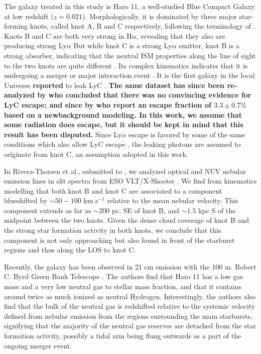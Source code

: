\documentclass[twocolumn,]{aastex61}
\begin{document}
The galaxy treated in this study is Haro 11, a well-studied Blue Compact Galaxy
at low redshift ($z = 0.021$). Morphologically, it is dominated by three major
star-forming knots, called knot A, B and C respectively, following the
terminology of \citet{Vader1993} \citep[see also][ and
fig.~\ref{fig:apert}]{Kunth1998, Hayes2007}.  Knots B and C are both very strong
in H$\alpha$, revealing that they also are producing strong Ly$\alpha$ 
But while knot C is a strong
Ly$\alpha$ emitter, knot B is a strong absorber, indicating that the neutral ISM
properties along the line of sight to the two knots are quite different
\citep{Hayes2009,Ostlin2009}.  Its complex kinematics indicates that it is
undergoing a merger or major interaction event \citep{Ostlin2001, Ostlin2015,
James2014}. It is the first galaxy in the local Universe \textbf{reported} to leak LyC
\citep{Bergvall2006}. \textbf{The same dataset has since been re-analyzed by
\cite{Grimes2007} who concluded that there was no convincing evidence for LyC
escape; and since by \cite{Leitet2011} who report an escape fraction of $3.3 \pm
0.7 \%$ based on a newbackground modeling. In this work, we assume that some
radiation does escape, but it should be kept in mind that this result has been
disputed.} Since Ly$\alpha$ escape is favored 
by some of the same conditions which also allow LyC escape 
\citep[see e.g. ][]{Hayes2015, DijkstraRev, Leitet2011}, the leaking photons 
are assumed to originate from knot C, an assumption adopted in this work.

In Rivera-Thorsen et al., submitted to \apj, we analyzed optical and NUV nebular
emission lines in slit spectra from ESO VLT/X-Shooter \citep[see
also][]{Guseva2012}. We find from kinematics modelling that both knot B and knot
C are associated to a component blueshifted by $\sim 50 - 100$ km s$^{-1}$
relative to the mean nebular velocity.  This component extends as far as $\sim
200$ pc. SE of knot B, and $\sim 1.5$ kpc S of the midpoint between the two
knots. Given the dense cloud coverage of knot B and the strong star formation
activity in both knots, we conclude that this component is not only approaching
but also found in front of the starburst regions and thus along the LOS to knot
C.

Recently, the galaxy has been observed in 21 cm  emission with
the 100 m. Robert C. Byrd Green Bank Telescope \citep{Pardy2016arXiv}.
The authors find that Haro 11 has a low gas mass and a very low neutral
gas to stellar mass fraction, and that it contains around twice as much
ionized as neutral Hydrogen. Interestingly, the authors also find that
the bulk of the neutral gas is redshifted relative to the systemic 
velocity defined from nebular emission from the  regions surrounding
the main starbursts, signifying that the majority of the neutral gas
reserves are detached from the star formation activity, possibly a tidal
arm being flung outwards as a part of the ongoing merger event.
\end{document}
